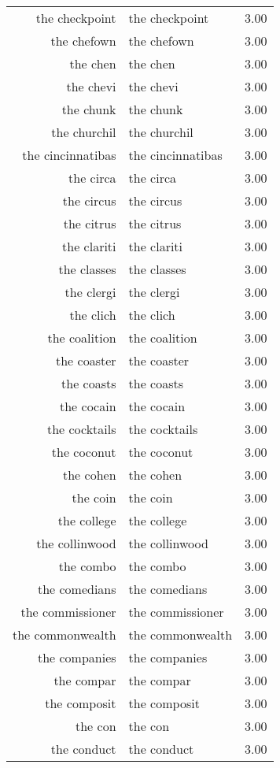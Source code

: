\begin{table}[ht]
\begin{tabular}{rlr}
  the checkpoint & the checkpoint & 3.00 \\ 
  the chefown & the chefown & 3.00 \\ 
  the chen & the chen & 3.00 \\ 
  the chevi & the chevi & 3.00 \\ 
  the chunk & the chunk & 3.00 \\ 
  the churchil & the churchil & 3.00 \\ 
  the cincinnatibas & the cincinnatibas & 3.00 \\ 
  the circa & the circa & 3.00 \\ 
  the circus & the circus & 3.00 \\ 
  the citrus & the citrus & 3.00 \\ 
  the clariti & the clariti & 3.00 \\ 
  the classes & the classes & 3.00 \\ 
  the clergi & the clergi & 3.00 \\ 
  the clich & the clich & 3.00 \\ 
  the coalition & the coalition & 3.00 \\ 
  the coaster & the coaster & 3.00 \\ 
  the coasts & the coasts & 3.00 \\ 
  the cocain & the cocain & 3.00 \\ 
  the cocktails & the cocktails & 3.00 \\ 
  the coconut & the coconut & 3.00 \\ 
  the cohen & the cohen & 3.00 \\ 
  the coin & the coin & 3.00 \\ 
  the college & the college & 3.00 \\ 
  the collinwood & the collinwood & 3.00 \\ 
  the combo & the combo & 3.00 \\ 
  the comedians & the comedians & 3.00 \\ 
  the commissioner & the commissioner & 3.00 \\ 
  the commonwealth & the commonwealth & 3.00 \\ 
  the companies & the companies & 3.00 \\ 
  the compar & the compar & 3.00 \\ 
  the composit & the composit & 3.00 \\ 
  the con & the con & 3.00 \\ 
  the conduct & the conduct & 3.00 \\ 

\end{tabular}
\end{table}
